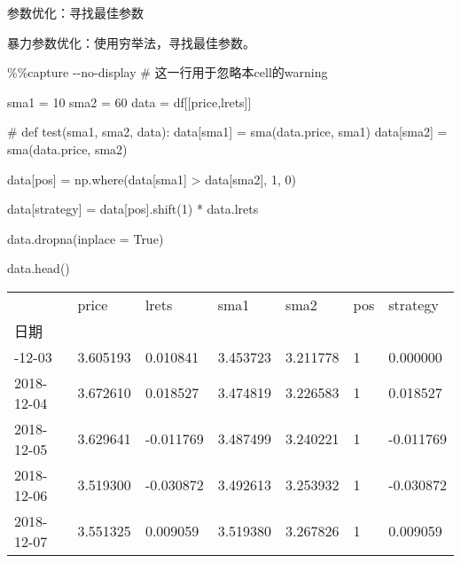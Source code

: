\documentclass[
  letterpaper,
  DIV=11,
  numbers=noendperiod]{scrreprt}
\newenvironment{Shaded}{\begin{snugshade}}{\end{snugshade}}
\newcommand{\CommentTok}[1]{\textcolor[rgb]{0.37,0.37,0.37}{#1}}
\newcommand{\DecValTok}[1]{\textcolor[rgb]{0.68,0.00,0.00}{#1}}
\newcommand{\NormalTok}[1]{\textcolor[rgb]{0.00,0.23,0.31}{#1}}
\newcommand{\OperatorTok}[1]{\textcolor[rgb]{0.37,0.37,0.37}{#1}}
\newcommand{\StringTok}[1]{\textcolor[rgb]{0.13,0.47,0.30}{#1}}
\newcommand{\VariableTok}[1]{\textcolor[rgb]{0.07,0.07,0.07}{#1}}
\begin{document}
参数优化：寻找最佳参数

暴力参数优化：使用穷举法，寻找最佳参数。

\begin{Shaded}
\begin{Highlighting}[]
\OperatorTok{\%\%}\NormalTok{capture }\OperatorTok{{-}{-}}\NormalTok{no}\OperatorTok{{-}}\NormalTok{display }
\CommentTok{\# 这一行用于忽略本cell的warning}

\NormalTok{sma1 }\OperatorTok{=} \DecValTok{10}
\NormalTok{sma2 }\OperatorTok{=} \DecValTok{60}
\NormalTok{data }\OperatorTok{=}\NormalTok{ df[[}\StringTok{\textquotesingle{}price\textquotesingle{}}\NormalTok{,}\StringTok{\textquotesingle{}lrets\textquotesingle{}}\NormalTok{]]}

\CommentTok{\# def test(sma1, sma2, data):}
\NormalTok{data[}\StringTok{\textquotesingle{}sma1\textquotesingle{}}\NormalTok{] }\OperatorTok{=}\NormalTok{ sma(data.price, sma1)}
\NormalTok{data[}\StringTok{\textquotesingle{}sma2\textquotesingle{}}\NormalTok{] }\OperatorTok{=}\NormalTok{ sma(data.price, sma2)}

\NormalTok{data[}\StringTok{\textquotesingle{}pos\textquotesingle{}}\NormalTok{] }\OperatorTok{=}\NormalTok{ np.where(data[}\StringTok{\textquotesingle{}sma1\textquotesingle{}}\NormalTok{] }\OperatorTok{\textgreater{}}\NormalTok{ data[}\StringTok{\textquotesingle{}sma2\textquotesingle{}}\NormalTok{], }\DecValTok{1}\NormalTok{, }\DecValTok{0}\NormalTok{)}

\NormalTok{data[}\StringTok{\textquotesingle{}strategy\textquotesingle{}}\NormalTok{] }\OperatorTok{=}\NormalTok{ data[}\StringTok{\textquotesingle{}pos\textquotesingle{}}\NormalTok{].shift(}\DecValTok{1}\NormalTok{) }\OperatorTok{*}\NormalTok{ data.lrets}

\NormalTok{data.dropna(inplace }\OperatorTok{=} \VariableTok{True}\NormalTok{)}

\NormalTok{data.head()}
\end{Highlighting}
\end{Shaded}

\begin{longtable}[]{@{}lllllll@{}}
\toprule\noalign{}
& price & lrets & sma1 & sma2 & pos & strategy \\
日期 & & & & & & \\
\midrule\noalign{}
\endhead
\bottomrule\noalign{}
\endlastfoot
2018-12-03 & 3.605193 & 0.010841 & 3.453723 & 3.211778 & 1 & 0.000000 \\
2018-12-04 & 3.672610 & 0.018527 & 3.474819 & 3.226583 & 1 & 0.018527 \\
2018-12-05 & 3.629641 & -0.011769 & 3.487499 & 3.240221 & 1 &
-0.011769 \\
2018-12-06 & 3.519300 & -0.030872 & 3.492613 & 3.253932 & 1 &
-0.030872 \\
2018-12-07 & 3.551325 & 0.009059 & 3.519380 & 3.267826 & 1 & 0.009059 \\
\end{longtable}
\end{document}
